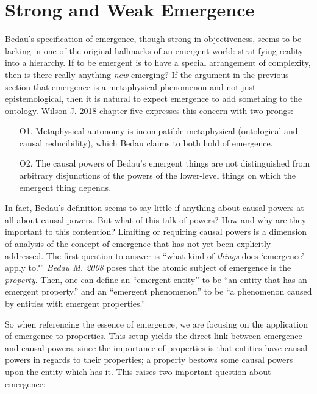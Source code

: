 \documentclass{article}
\newcommand{\ti}[1]{\textit{#1}}
\renewcommand{\cite}[1]{\hyperlink{#1}{#1}}
\begin{document}
\section{Strong and Weak Emergence}

Bedau's specification of emergence, though strong in objectiveness, seems to be lacking in one of the original hallmarks of an emergent world: stratifying reality into a hierarchy. If to be emergent is to have a special arrangement of complexity, then is there really anything \ti{new} emerging? If the argument in the previous section that emergence is a metaphysical phenomenon and not just epistemological, then it is natural to expect emergence to add something to the ontology. \cite{Wilson J. 2018} chapter five expresses this concern with two prongs:

\begin{enumerate}
    \item[O1.] Metaphysical autonomy is incompatible metaphysical (ontological and causal reducibility), which Bedau claims to both hold of emergence.
    \item[O2.] The causal powers of Bedau's emergent things are not distinguished from arbitrary disjunctions of the powers of the lower-level things on which the emergent thing depends.
\end{enumerate}


In fact, Bedau's definition seems to say little if anything about causal powers at all about causal powers. But what of this talk of powers? How and why are they important to this contention? Limiting or requiring causal powers is a dimension of analysis of the concept of emergence that has not yet been explicitly addressed. The first question to answer is ``what kind of \ti{things} does `emergence' apply to?'' \ti{Bedau M. 2008} poses that the atomic subject of emergence is the \ti{property}. Then, one can define an ``emergent entity'' to be ``an entity that has an emergent property.'' and an ``emergent phenomenon'' to be ``a phenomenon caused by entities with emergent properties.''

So when referencing the essence of emergence, we are focusing on the application of emergence to properties. This setup yields the direct link between emergence and causal powers, since the importance of properties is that entities have causal powers in regards to their properties; a property bestows some causal powers upon the entity which has it. This raises two important question about emergence:
\end{document}
